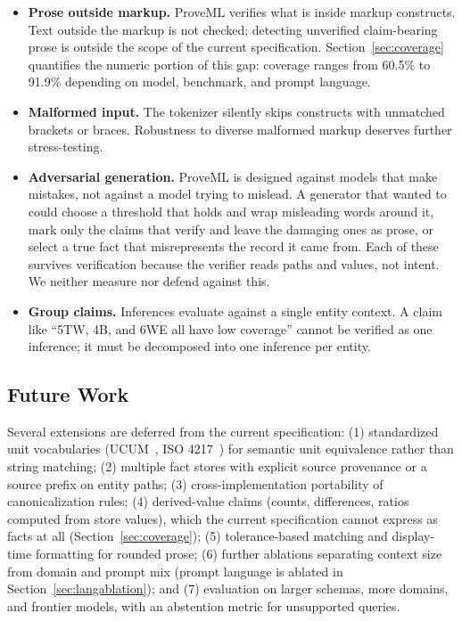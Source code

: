 \documentclass[11pt,a4paper]{article}
\begin{document}
\begin{itemize}[nosep]
    \item \textbf{Prose outside markup.} ProveML verifies what is inside markup constructs. Text outside the markup is not checked; detecting unverified claim-bearing prose is outside the scope of the current specification. Section~\ref{sec:coverage} quantifies the numeric portion of this gap: coverage ranges from 60.5\% to 91.9\% depending on model, benchmark, and prompt language.
    \item \textbf{Malformed input.} The tokenizer silently skips constructs with unmatched brackets or braces. Robustness to diverse malformed markup deserves further stress-testing.
    \item \textbf{Adversarial generation.} ProveML is designed against models that make mistakes, not against a model trying to mislead. A generator that wanted to could choose a threshold that holds and wrap misleading words around it, mark only the claims that verify and leave the damaging ones as prose, or select a true fact that misrepresents the record it came from. Each of these survives verification because the verifier reads paths and values, not intent. We neither measure nor defend against this.
    \item \textbf{Group claims.} Inferences evaluate against a single entity context. A claim like ``5TW, 4B, and 6WE all have low coverage'' cannot be verified as one inference; it must be decomposed into one inference per entity.
\end{itemize}

\subsection{Future Work}

Several extensions are deferred from the current specification: (1) standardized unit vocabularies (UCUM~\citep{ucum}, ISO 4217~\citep{iso4217}) for semantic unit equivalence rather than string matching; (2) multiple fact stores with explicit source provenance or a source prefix on entity paths; (3) cross-implementation portability of canonicalization rules; (4) derived-value claims (counts, differences, ratios computed from store values), which the current specification cannot express as facts at all (Section~\ref{sec:coverage}); (5) tolerance-based matching and display-time formatting for rounded prose; (6) further ablations separating context size from domain and prompt mix (prompt language is ablated in Section~\ref{sec:langablation}); and (7) evaluation on larger schemas, more domains, and frontier models, with an abstention metric for unsupported queries.
\end{document}
